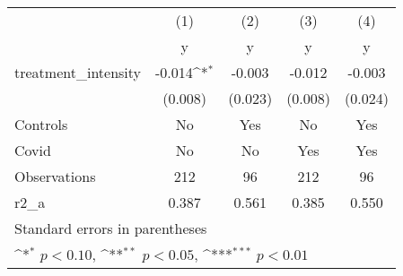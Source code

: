{
\def\sym#1{\ifmmode^{#1}\else\(^{#1}\)\fi}
\begin{tabular}{l*{4}{c}}
\hline\hline
                    &\multicolumn{1}{c}{(1)}&\multicolumn{1}{c}{(2)}&\multicolumn{1}{c}{(3)}&\multicolumn{1}{c}{(4)}\\
                    &\multicolumn{1}{c}{y}&\multicolumn{1}{c}{y}&\multicolumn{1}{c}{y}&\multicolumn{1}{c}{y}\\
\hline
treatment\_intensity &      -0.014\sym{*}  &      -0.003         &      -0.012         &      -0.003         \\
                    &     (0.008)         &     (0.023)         &     (0.008)         &     (0.024)         \\
[1em]
Controls            &          No         &         Yes         &          No         &         Yes         \\
[1em]
Covid               &          No         &          No         &         Yes         &         Yes         \\
\hline
Observations        &         212         &          96         &         212         &          96         \\
r2\_a                &       0.387         &       0.561         &       0.385         &       0.550         \\
\hline\hline
\multicolumn{5}{l}{\footnotesize Standard errors in parentheses}\\
\multicolumn{5}{l}{\footnotesize \sym{*} \(p<0.10\), \sym{**} \(p<0.05\), \sym{***} \(p<0.01\)}\\
\end{tabular}
}
